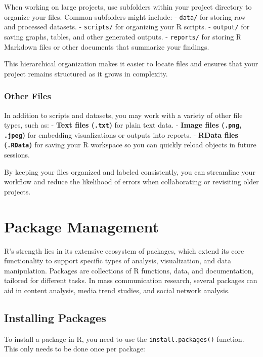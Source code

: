 \documentclass[
]{book}
\begin{document}
When working on large projects, use subfolders within your project directory to organize your files. Common subfolders might include: - \texttt{data/} for storing raw and processed datasets. - \texttt{scripts/} for organizing your R scripts. - \texttt{output/} for saving graphs, tables, and other generated outputs. - \texttt{reports/} for storing R Markdown files or other documents that summarize your findings.

This hierarchical organization makes it easier to locate files and ensures that your project remains structured as it grows in complexity.

\subsubsection*{Other Files}\label{other-files}

In addition to scripts and datasets, you may work with a variety of other file types, such as: - \textbf{Text files (\texttt{.txt})} for plain text data. - \textbf{Image files (\texttt{.png}, \texttt{.jpeg})} for embedding visualizations or outputs into reports. - \textbf{RData files (\texttt{.RData})} for saving your R workspace so you can quickly reload objects in future sessions.

By keeping your files organized and labeled consistently, you can streamline your workflow and reduce the likelihood of errors when collaborating or revisiting older projects.

\section{Package Management}\label{package-management}

R's strength lies in its extensive ecosystem of packages, which extend its core functionality to support specific types of analysis, visualization, and data manipulation. Packages are collections of R functions, data, and documentation, tailored for different tasks. In mass communication research, several packages can aid in content analysis, media trend studies, and social network analysis.

\subsection*{Installing Packages}\label{installing-packages}

To install a package in R, you need to use the \texttt{install.packages()} function. This only needs to be done once per package:
\end{document}
